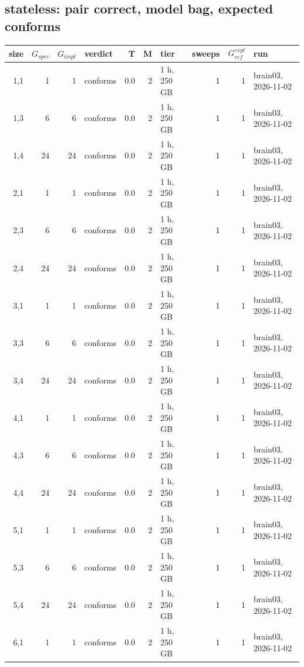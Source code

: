 \documentclass[10pt]{article}
\begin{document}
\subsection*{stateless: pair \textsf{correct}, model bag, expected conforms}
\begin{longtable}{@{}rrrlrrlrrl@{}}
\toprule
size & $G_{\mathit{spec}}$ & $G_{\mathit{impl}}$ & verdict & T & M & tier & sweeps & $G_{\mathit{ref}}^{\mathit{expl}}$ & run \\
\midrule
\endhead
\color{blue} 1,1 & 1 & 1 & conforms & 0.0 & 2 & 1 h, 250 GB & 1 & 1 & brain03, 2026-11-02 \\
\color{blue} 1,3 & 6 & 6 & conforms & 0.0 & 2 & 1 h, 250 GB & 1 & 1 & brain03, 2026-11-02 \\
\color{blue} 1,4 & 24 & 24 & conforms & 0.0 & 2 & 1 h, 250 GB & 1 & 1 & brain03, 2026-11-02 \\
\color{blue} 2,1 & 1 & 1 & conforms & 0.0 & 2 & 1 h, 250 GB & 1 & 1 & brain03, 2026-11-02 \\
\color{blue} 2,3 & 6 & 6 & conforms & 0.0 & 2 & 1 h, 250 GB & 1 & 1 & brain03, 2026-11-02 \\
\color{blue} 2,4 & 24 & 24 & conforms & 0.0 & 2 & 1 h, 250 GB & 1 & 1 & brain03, 2026-11-02 \\
\color{blue} 3,1 & 1 & 1 & conforms & 0.0 & 2 & 1 h, 250 GB & 1 & 1 & brain03, 2026-11-02 \\
\color{blue} 3,3 & 6 & 6 & conforms & 0.0 & 2 & 1 h, 250 GB & 1 & 1 & brain03, 2026-11-02 \\
\color{blue} 3,4 & 24 & 24 & conforms & 0.0 & 2 & 1 h, 250 GB & 1 & 1 & brain03, 2026-11-02 \\
\color{blue} 4,1 & 1 & 1 & conforms & 0.0 & 2 & 1 h, 250 GB & 1 & 1 & brain03, 2026-11-02 \\
\color{blue} 4,3 & 6 & 6 & conforms & 0.0 & 2 & 1 h, 250 GB & 1 & 1 & brain03, 2026-11-02 \\
\color{blue} 4,4 & 24 & 24 & conforms & 0.0 & 2 & 1 h, 250 GB & 1 & 1 & brain03, 2026-11-02 \\
\color{blue} 5,1 & 1 & 1 & conforms & 0.0 & 2 & 1 h, 250 GB & 1 & 1 & brain03, 2026-11-02 \\
\color{blue} 5,3 & 6 & 6 & conforms & 0.0 & 2 & 1 h, 250 GB & 1 & 1 & brain03, 2026-11-02 \\
\color{blue} 5,4 & 24 & 24 & conforms & 0.0 & 2 & 1 h, 250 GB & 1 & 1 & brain03, 2026-11-02 \\
\color{blue} 6,1 & 1 & 1 & conforms & 0.0 & 2 & 1 h, 250 GB & 1 & 1 & brain03, 2026-11-02 \\

\end{longtable}
\end{document}
